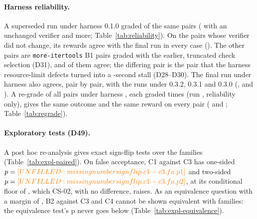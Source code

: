 \paragraph{Harness reliability.} A superseded run under harness 0.1.0 graded  of the same pairs
( with an unchanged verifier and  more; Table~\ref{tab:reliability}). On the
pairs whose verifier did not change, its rewards agree with the final run in every case (). The
other pairs are \texttt{more-itertools} B1 pairs graded with the earlier, truncated check selection (D31), and
 of them agree; the differing pair is the pair that the harness resource-limit defects
turned into a -second stall (D28--D30). The final run under harness  also
agrees, pair by pair, with the runs under 0.3.2, 0.3.1 and 0.3.0 (, 
and ). A re-grade of all  pairs under harness , each graded
 times (run \texttt{\REGRADERUN}, reliability only), gives the same outcome and the same reward on every
pair ( and ; Table~\ref{tab:regrade}).


\paragraph{Exploratory tests (D49).} A post hoc re-analysis gives exact sign-flip tests over the families
(Table~\ref{tab:expl-paired}). On false acceptance, C1 against C3 has one-sided $p=\plv{signflip.c1-c3.fa.p1}$ and
two-sided $p=\plv{signflip.c1-c3.fa.p2}$, at its conditional floor of , which CS-02, with no
difference, raises. As an equivalence question with a margin of , B2 against C3 and C4 cannot be shown
equivalent with  families: the equivalence test's p never goes below 
(Table~\ref{tab:expl-equivalence}).


